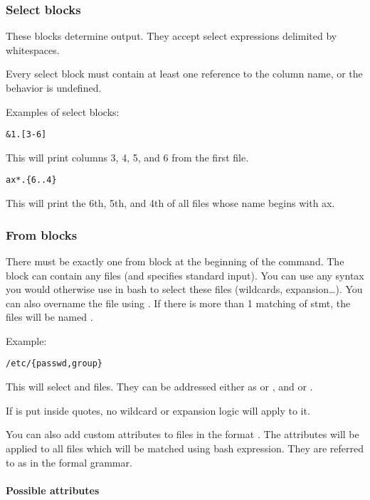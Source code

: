 \subsubsection{Select blocks}
These blocks determine output. They accept select expressions delimited by whitespaces.

Every select block must contain at least one reference to the column name, or the behavior is undefined.

Examples of select blocks:
\begin{verbatim}
&1.[3-6]
\end{verbatim}
This will print columns 3, 4, 5, and 6 from the first file.

\begin{verbatim}
ax*.{6..4}
\end{verbatim}
This will print the 6th, 5th, and 4th of all files whose name begins with ax.

\subsubsection{From blocks}
There must be exactly one from block at the beginning of the command. 
The block can contain any files (and \icode{-} specifies standard input). 
You can use any syntax you would otherwise use in bash to select these files (wildcards, expansion\ldots{})\break \cite{bash-reference-manual}. 
You can also overname the file using . If there is more than 1 matching of stmt, the files will be named .

Example:
\begin{verbatim}
/etc/{passwd,group}
\end{verbatim}

This will select  and  files. They can be addressed either as  or , and  or .

If  is put inside  quotes, no wildcard or expansion logic will apply to it.

You can also add custom attributes to files in the format \break {}. The attributes will be applied to all files which will be matched using  bash expression.
They are referred to as  in the formal grammar.

\paragraph{Possible attributes}

